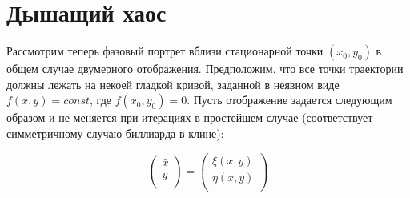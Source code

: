 \documentclass[a4paper]{article}
\begin{document}


\section{Дышащий хаос}

Рассмотрим теперь фазовый портрет вблизи стационарной точки $(x_0,y_0)$ в общем случае двумерного отображения. Предположим, что все точки траектории должны лежать на некоей гладкой кривой, заданной в неявном виде $f(x,y)=const$, где $f(x_0,y_0)=0$. Пусть отображение задается следующим образом и не меняется при итерациях в простейшем случае (соответствует симметричному случаю биллиарда в клине):

\begin{equation} \label{GrindEQ_b_kh_1} \left(
\begin{array}{c}
 \bar{x} \\
 \bar{y} \\
\end{array}
\right)=\left(
\begin{array}{c}
 \xi (x,y) \\
 \eta (x,y) \\
\end{array}
\right) \end{equation}
\end{document}

